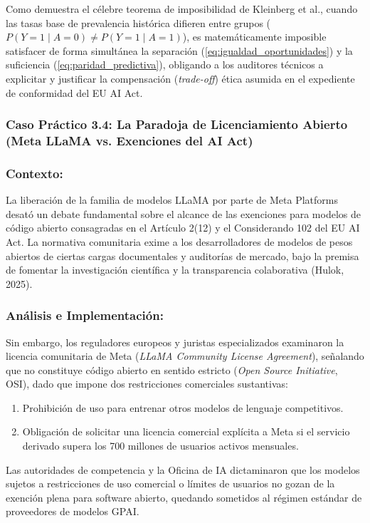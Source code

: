 Como demuestra el célebre teorema de imposibilidad de Kleinberg et al., cuando las tasas base de prevalencia histórica difieren entre grupos ($P(Y=1 \mid A=0) \neq P(Y=1 \mid A=1)$), es matemáticamente imposible satisfacer de forma simultánea la separación (\ref{eq:igualdad_oportunidades}) y la suficiencia (\ref{eq:paridad_predictiva}), obligando a los auditores técnicos a explicitar y justificar la compensación (\textit{trade-off}) ética asumida en el expediente de conformidad del EU AI Act.

\subsubsection{Caso Práctico 3.4: La Paradoja de Licenciamiento Abierto (Meta LLaMA vs. Exenciones del AI Act)}

\subsubsection*{Contexto:}
La liberación de la familia de modelos LLaMA por parte de Meta Platforms desató un debate fundamental sobre el alcance de las exenciones para modelos de código abierto consagradas en el Artículo 2(12) y el Considerando 102 del EU AI Act. La normativa comunitaria exime a los desarrolladores de modelos de pesos abiertos de ciertas cargas documentales y auditorías de mercado, bajo la premisa de fomentar la investigación científica y la transparencia colaborativa (Hulok, 2025).

\subsubsection*{Análisis e Implementación:}
Sin embargo, los reguladores europeos y juristas especializados examinaron la licencia comunitaria de Meta (\textit{LLaMA Community License Agreement}), señalando que no constituye código abierto en sentido estricto (\textit{Open Source Initiative}, OSI), dado que impone dos restricciones comerciales sustantivas:
\begin{enumerate}[label=\arabic*., leftmargin=2em]
    \item Prohibición de uso para entrenar otros modelos de lenguaje competitivos.
    \item Obligación de solicitar una licencia comercial explícita a Meta si el servicio derivado supera los 700 millones de usuarios activos mensuales.
\end{enumerate}
Las autoridades de competencia y la Oficina de IA dictaminaron que los modelos sujetos a restricciones de uso comercial o límites de usuarios no gozan de la exención plena para software abierto, quedando sometidos al régimen estándar de proveedores de modelos GPAI.

